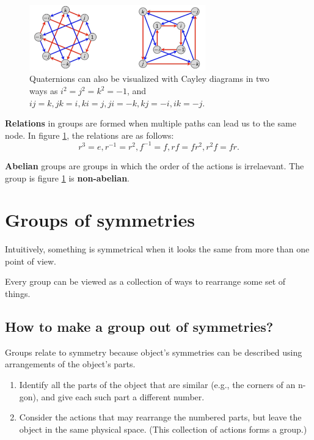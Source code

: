 \documentclass[twocolumn]{article}
\begin{document}
\begin{figure}[h]
    \centering
    \includegraphics[width = 3in]{figure/cayley_quaternion.png}
    \caption{Quaternions can also be visualized with Cayley diagrams in two ways as $i^2 = j^2 = k^2 = -1$, and $ij = k, jk = i, ki = j, ji = -k, kj = -i, ik = -j$.}
    \label{fig:cayley}
\end{figure}

\textbf{Relations} in groups are formed when multiple paths can lead us to the same node.
In figure \ref{fig:cayley}, the relations are as follows:
\begin{equation}
    r^3 = e, r^{-1} = r^2, f^{-1} = f, rf = fr^2, r^2 f = fr.
\end{equation}

\textbf{Abelian} groups are groups in which the order of the actions is irrelaevant. The group is figure \ref{fig:cayley} is \textbf{non-abelian}.

\section{Groups of symmetries}

Intuitively, something is symmetrical when it looks the same from more than one point of view.

\begin{tcolorbox}[colback=blue!5!white,colframe=blue!15!white,coltitle=black, boxrule=0pt,title=Cayley's Theorem, drop shadow southeast, enhanced]
    Every group can be viewed as a collection of ways to rearrange some set of things.
\end{tcolorbox}

\subsection{How to make a group out of symmetries?}

Groups relate to symmetry because object's symmetries can be described using arrangements of the object's parts.

\begin{tcolorbox}[colback=blue!5!white,colframe=blue!15!white,coltitle=black, boxrule=0pt,title=Algorithm, drop shadow southeast, enhanced]
    \begin{enumerate}
        \item Identify all the parts of the object that are similar (e.g., the corners of an n-gon), and give each such part a different number.
        \item Consider the actions that may rearrange the numbered parts, but leave the object in the same physical space. (This collection of actions forms a group.)
    \end{enumerate}
\end{tcolorbox}
\end{document}
